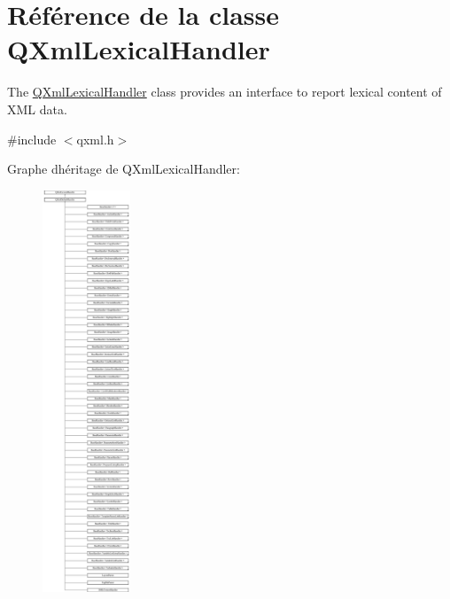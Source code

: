 \hypertarget{class_q_xml_lexical_handler}{}\section{Référence de la classe Q\+Xml\+Lexical\+Handler}
\label{class_q_xml_lexical_handler}


The \hyperlink{class_q_xml_lexical_handler}{Q\+Xml\+Lexical\+Handler} class provides an interface to report lexical content of X\+M\+L data.  




{\ttfamily \#include $<$qxml.\+h$>$}

Graphe d\textquotesingle{}héritage de Q\+Xml\+Lexical\+Handler\+:\begin{figure}[H]
\begin{center}
\leavevmode
\includegraphics[height=12.000000cm]{class_q_xml_lexical_handler}
\end{center}
\end{figure}
